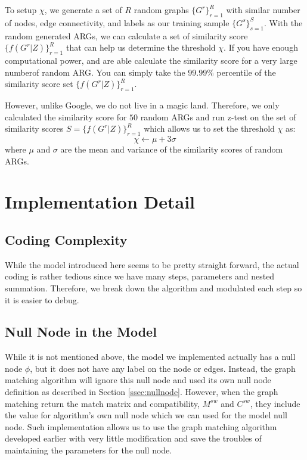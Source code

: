 To setup $\chi$, we generate a set of $R$ random graphs $\{G^r\}^{R}_{r=1}$ with similar number of nodes, edge connectivity\footnotemark, and labels as our training sample $\{G^s\}^{S}_{s=1}$. With the random generated ARGs, we can calculate a set of similarity score $\{f(G^r|Z)\}^{R}_{r=1}$ that can help us determine the threshold $\chi$. If you have enough computational power, and are able calculate the similarity score for a very large number\footnotemark of random ARG. You can simply take the $99.99\%$ percentile of the similarity score set $\{f(G^r|Z)\}^{R}_{r=1}$.\\

However, unlike Google\footnotemark, we do not live in a magic land. Therefore, we only calculated the similarity score for $50$ random ARGs and run z-test on the set of similarity scores $S=\{f(G^r|Z)\}^{R}_{r=1}$ which allows us to set the threshold $\chi$ as: 
$$\chi \leftarrow \mu+3\sigma$$
where $\mu$ and $\sigma$ are the mean and variance of the similarity scores of random ARGs.

\section{Implementation Detail}

\subsection{Coding Complexity}

While the model introduced here seems to be pretty straight forward, the actual coding is rather tedious since we have many steps, parameters and nested summation. Therefore, we break down the algorithm and modulated each step so it is easier to debug.

\subsection{Null Node in the Model}

While it is not mentioned above, the model we implemented actually has a null node $\phi$, but it does not have any label on the node or edges. Instead, the graph matching algorithm will ignore this null node and used its own null node definition as described in Section \ref{ssec:nullnode}. However, when the graph matching return the match matrix and compatibility, $M^{sw}$ and $C^{sw}$, they include the value for algorithm's own null node which we can used for the model null node. Such implementation allows us to use the graph matching algorithm developed earlier with very little modification and save the troubles of maintaining the parameters for the null node.

